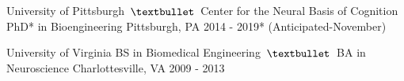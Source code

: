 \vspace*{0.20cm}

\begin{cventries}
\vspace*{0.20cm}
  \cventry
    {University of Pittsburgh $\,\textbullet\,$ Center for the Neural Basis of Cognition} %
    {PhD* in Bioengineering} %
    {Pittsburgh, PA} %
    {2014 - 2019* (Anticipated-November)} %
    {
    }
    \vspace*{-0.2cm}
    
  \cventry
    {University of Virginia} %
    {BS in Biomedical Engineering $\,\textbullet\,$ BA in Neuroscience} %
    {Charlottesville, VA} %
    {2009 - 2013} %
    {
    }
    \vspace*{-0.6cm}

\end{cventries}

